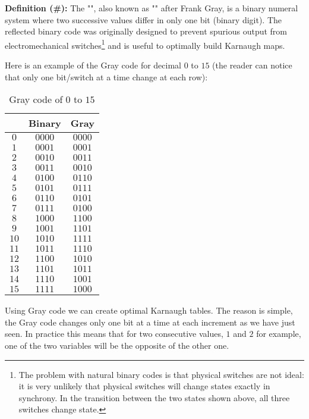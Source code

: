 	\textbf{Definition (\#\mydef):} The "", also known as "" after Frank Gray, is a binary numeral system where two successive values differ in only one bit (binary digit). The reflected binary code was originally designed to prevent spurious output from electromechanical switches\footnote{The problem with natural binary codes is that physical switches are not ideal: it is very unlikely that physical switches will change states exactly in synchrony. In the transition between the two states shown above, all three switches change state.} and is useful to optimally build Karnaugh maps.

	Here is an example of the Gray code for decimal $0$ to $15$ (the reader can notice that only one bit/switch at a time change at each row):
	\begin{table}[H]
		\centering
		\begin{tabular}{|c|c|c|}
		\hline
		\rowcolor[HTML]{9B9B9B} 
		\multicolumn{1}{|l|}{\cellcolor[HTML]{9B9B9B}\textbf{Decimal}} & \multicolumn{1}{l|}{\cellcolor[HTML]{9B9B9B}\textbf{Binary}} & \multicolumn{1}{l|}{\cellcolor[HTML]{9B9B9B}\textbf{Gray}} \\ \hline
		$0$ & $0000$ & $0000$ \\ \hline
		$1$ & $0001$ & $0001$ \\ \hline
		$2$ & $0010$ & $0011$ \\ \hline
		$3$ & $0011$ & $0010$ \\ \hline
		$4$ & $0100$ & $0110$ \\ \hline
		$5$ & $0101$ & $0111$ \\ \hline
		$6$ & $0110$ & $0101$ \\ \hline
		$7$ & $0111$ & $0100$ \\ \hline
		$8$ & $1000$ & $1100$ \\ \hline
		$9$ & $1001$ & $1101$ \\ \hline
		$10$ & $1010$ & $1111$ \\ \hline
		$11$ & $1011$ & $1110$ \\ \hline
		$12$ & $1100$ & $1010$ \\ \hline
		$13$ & $1101$ & $1011$ \\ \hline
		$14$ & $1110$ & $1001$ \\ \hline
		$15$ & $1111$ & $1000$ \\ \hline
		\end{tabular}
		\caption{Gray code of $0$ to $15$}
	\end{table}
	Using Gray code we can create optimal Karnaugh tables. The reason is simple, the Gray code changes only one bit at a time at each increment as we have just seen. In practice this means that for two consecutive values, $1$ and $2$ for example, one of the two variables will be the opposite of the other one.
	
